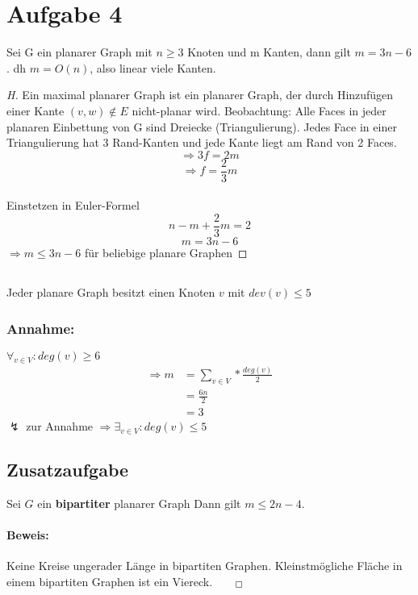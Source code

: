 \documentclass[10pt,a4paper]{article}
\begin{document}
\section*{Aufgabe 4}
Sei G ein planarer Graph mit $ n \geq 3 $ Knoten und m Kanten, dann gilt $ m = 3n-6 $. dh $ m=O(n) $, also linear viele Kanten.
\begin{proof}[H]
	Ein maximal planarer Graph ist ein planarer Graph, der durch Hinzufügen einer Kante $ (v,w) \notin E $ nicht-planar wird. Beobachtung: Alle Faces in jeder planaren Einbettung von G sind Dreiecke (Triangulierung). Jedes Face in einer Triangulierung hat 3 Rand-Kanten und jede Kante liegt am Rand von 2 Faces. 
	$$\Rightarrow 3f = 2m $$
	$$\Rightarrow f = \frac{2}{3}m $$\\
	Einstetzen in Euler-Formel
	$$ n - m + \frac{2}{3}m = 2$$
	$$ m = 3n-6$$
	$\Rightarrow m \leq 3n-6 $ für beliebige planare Graphen
\end{proof}

\subsection*{}
Jeder planare Graph besitzt einen Knoten $v$ mit $dev(v) \leq 5$
\subsubsection*{Annahme:}
$\forall_{v \in V}: deg(v) \geq 6$\\
\begin{equation*}
\begin{split}
\Rightarrow m &= \sum \limits_{v \in V} * \frac{deg(v)}{2}\\ 
              &= \frac{6n}{2}\\
              &= 3
\end{split}
\end{equation*}
$\lightning$ zur Annahme $\Rightarrow \exists_{v \in V}: deg(v) \leq 5$ 

\subsection*{Zusatzaufgabe}
Sei $G$ ein \textbf{bipartiter} planarer Graph Dann gilt $ m \leq 2n-4 $. 

\paragraph{Beweis:} Keine Kreise ungerader Länge in bipartiten Graphen. Kleinstmögliche Fläche in einem bipartiten Graphen ist ein Viereck.$_{\qed}$
\end{document}
